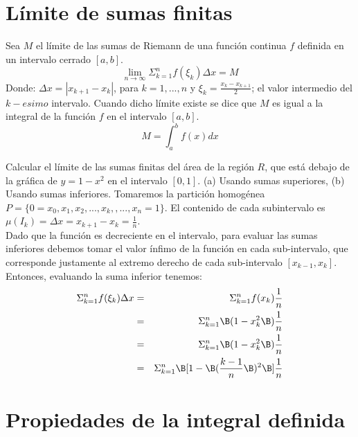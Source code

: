 		\section{Límite de sumas finitas} %
		\label{sec:límite_de_sumas_finitas}
			Sea $M$ el límite de las sumas de Riemann de una función continua $f$ definida en un intervalo cerrado $[a,b]$. 
			\begin{equation*}
				\lim_{n \rightarrow	\infty} \Sigma_{k = 1}^{n} f(\xi_k) \Delta x = M 
			\end{equation*}
			Donde: $\Delta x = |x_{k+1} - x_{k}|$, para $k = 1, ..., n$ y $\xi_k = \frac{x_k - x_{k+1}}{2}$; el valor intermedio del $k-esimo$ intervalo. 
			Cuando dicho límite existe se dice que $M$ es igual a la integral de la función $f$ en el intervalo $[a,b]$. 
			\begin{equation}
				M = \int_a^b f(x) dx
			\end{equation}
		    \begin{ejer}[1]
			Calcular el límite de las sumas finitas del área de la región $R$, que está debajo de la gráfica de $y = 1 - x^2$ en el intervalo $[0,1]$. (a) Usando sumas superiores, (b) Usando sumas inferiores. 
			Tomaremos la partición homogénea $P = \lbrace 0 = x_0, x_1, x_2, ..., x_k, ,..., x_n =1 \rbrace$. El contenido de cada subintervalo es $\mu(I_k) = \Delta x = x_{k+1} - x_{k} = \frac{1}{n}$. \\ 
			Dado que la función es decreciente en el intervalo, para evaluar las sumas inferiores debemos tomar el valor ínfimo de la función en cada sub-intervalo, que corresponde justamente al extremo derecho de cada sub-intervalo $[x_{k-1}, x_{k}]$.\\
			Entonces, evaluando la suma inferior tenemos: 
		    \begin{eqnarray*}
		        \Sigma_{k = 1}^{n} f(\xi_k) \Delta x &=& \Sigma_{k = 1}^{n} f(x_k) \frac{1}{n} \\
		        &=& \Sigma_{k = 1}^{n} \B(1-x_k^2\B) \frac{1}{n} \\
		        &=& \Sigma_{k = 1}^{n} \B(1-x_k^2\B) \frac{1}{n} \\
		        &=& \Sigma_{k = 1}^{n} \B[1 - \B(\frac{k-1}{n}\B)^2\B] \frac{1}{n}
		    \end{eqnarray*}
			\end{ejer}
		\section{Propiedades de la integral definida} %
		\label{sec:propiedades_de_la_integral_definida}
			

